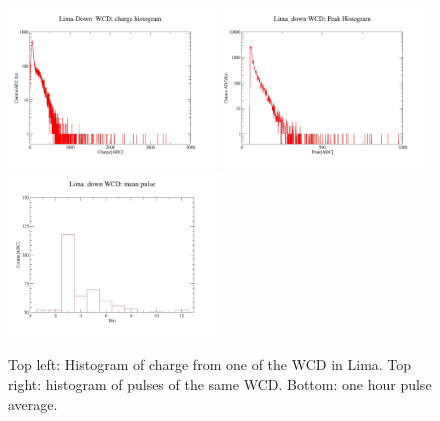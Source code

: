 \begin{figure}[h!]
\begin{center}
\includegraphics[width=0.49\textwidth]{images/peru/Lima_down_charge.jpg}
\includegraphics[width=0.49\textwidth]{images/peru/Lima_down_peak.jpg}
\includegraphics[width=0.5\textwidth]{images/peru/lima_down_pulse.jpg}
\caption{Top left: Histogram of charge from one of the WCD in Lima. Top right: histogram of pulses of the same WCD. Bottom: one hour pulse average.}
\label{fig:peru-res}
\end{center}
\end{figure}

